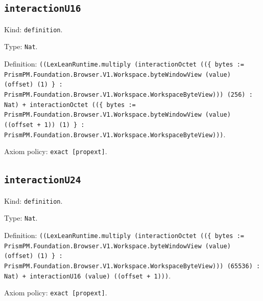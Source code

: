 \documentclass[11pt]{article}
\begin{document}
\subsection*{\texttt{interactionU16}}
\noindent Kind: \texttt{definition}.\par
\noindent Type: \texttt{Nat}.\par
\noindent Definition: \texttt{((LexLeanRuntime.multiply (interactionOctet ((\{ bytes := PrismPM.Foundation.Browser.V1.Workspace.byteWindowView (value) (offset) (1) \} : PrismPM.Foundation.Browser.V1.Workspace.WorkspaceByteView))) (256) : Nat) + interactionOctet ((\{ bytes := PrismPM.Foundation.Browser.V1.Workspace.byteWindowView (value) ((offset + 1)) (1) \} : PrismPM.Foundation.Browser.V1.Workspace.WorkspaceByteView)))}.\par
\noindent Axiom policy: \texttt{exact [propext]}.\par
\subsection*{\texttt{interactionU24}}
\noindent Kind: \texttt{definition}.\par
\noindent Type: \texttt{Nat}.\par
\noindent Definition: \texttt{((LexLeanRuntime.multiply (interactionOctet ((\{ bytes := PrismPM.Foundation.Browser.V1.Workspace.byteWindowView (value) (offset) (1) \} : PrismPM.Foundation.Browser.V1.Workspace.WorkspaceByteView))) (65536) : Nat) + interactionU16 (value) ((offset + 1)))}.\par
\noindent Axiom policy: \texttt{exact [propext]}.\par
\end{document}
